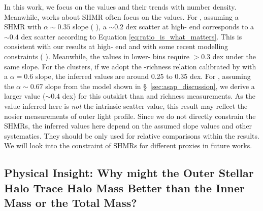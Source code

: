 \documentclass[fleqn,usenatbib,useAMS]{mnras}
\begin{document}
    In this work, we focus on the \sigmvir{} values and their trends with number density. 
    Meanwhile, works about SHMR often focus on the \sigms{} values.
    For , assuming a SHMR with $\alpha \sim 0.35$ slope (\eg{} \citealt{GoldenMarx2019,
    Huang2020}), a \sigms{}$\sim 0.2$ dex scatter at high-\mvir{} end corresponds to a 
    \sigmvir{}$\sim 0.4$ dex scatter according to Equation \ref{eq:ratio_is_what_matters}.
    This is consistent with our results at high-\mvir{} end and with some recent modelling
    constraints (\eg{} \citealt{Kravtsov2018, Behroozi2018}). 
    Meanwhile, the \sigmvir{} values in lower-\mvir{} bins require \sigms{}$>0.3$ dex under the 
    same slope. 
    For the \camira{} clusters, if we adopt the \mvir{}-richness relation calibrated by 
    \citet{Murata2019} with a $\alpha = 0.6$ slope, the inferred \sigms{} values are around 
    0.25 to 0.35 dex. 
    For , assuming the $\alpha \sim 0.67$ slope from the \asap{} model shown
    in \S\ \ref{sec:asap_discussion}, we derive a larger \sigms{} value ($\sim 0.4$ dex) for this
    outskirt \mstar{} than  and richness measurements. 
    As the \sigms{} value inferred here is \emph{not} the intrinsic scatter value, this result 
    may reflect the nosier measurements of outer light profile.
    Since we do not directly constrain the SHMRs, the inferred \sigms{} values here depend on the
    assumed slope values and other systematics.
    They should be only used for relative comparisons within the \topn{} results.
    We will look into the constraint of SHMRs for different \mvir{} proxies in future works.
    

\subsection{Physical Insight: Why might the Outer Stellar Halo Trace Halo Mass Better than the Inner
    Mass or the Total Mass?}
    \label{sec:outskirt_discussion}
\end{document}
